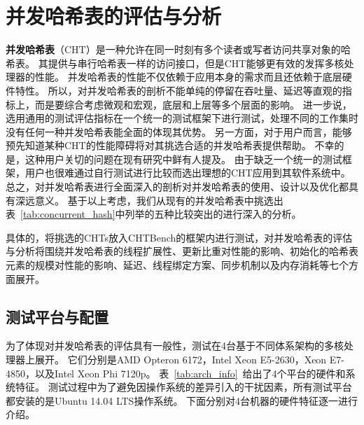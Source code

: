 \section{并发哈希表的评估与分析}
\textbf{并发哈希表}（CHT）是一种允许在同一时刻有多个读者或写者访问共享对象的哈希表。
其提供与串行哈希表一样的访问接口，但是CHT能够更有效的发挥多核处理器的性能。
并发哈希表的性能不仅依赖于应用本身的需求而且还依赖于底层硬件特性。
所以，对并发哈希表的剖析不能单纯的停留在吞吐量、延迟等直观的指标上，而是要综合考虑微观和宏观，底层和上层等多个层面的影响。
进一步说，选用通用的测试评估指标在一个统一的测试框架下进行测试，处理不同的工作集时没有任何一种并发哈希表能全面的体现其优势。
另一方面，对于用户而言，能够预先知道某种CHT的性能障碍将对其挑选合适的并发哈希表提供帮助。
不幸的是，这种用户关切的问题在现有研究中鲜有人提及。
由于缺乏一个统一的测试框架，用户也很难通过自行测试进行比较而选出理想的CHT应用到其软件系统中。
总之，对并发哈希表进行全面深入的剖析对并发哈希表的使用、设计以及优化都具有深远意义。
基于以上考虑，我们从现有的并发哈希表中挑选出表~\ref{tab:concurrent_hash}中列举的五种比较突出的进行深入的分析。

具体的，将挑选的CHTs放入CHTBench的框架内进行测试，对并发哈希表的评估与分析将围绕并发哈希表的线程扩展性、更新比重对性能的影响、初始化的哈希表元素的规模对性能的影响、延迟、线程绑定方案、同步机制以及内存消耗等七个方面展开。

\subsection{测试平台与配置}
为了体现对并发哈希表的评估具有一般性，测试在4台基于不同体系架构的多核处理器上展开。
它们分别是AMD Opteron 6172，Intel Xeon E5-2630，Xeon E7-4850，以及Intel Xeon Phi 7120p。
表~\ref{tab:arch_info}~给出了4个平台的硬件和系统特征。
测试过程中为了避免因操作系统的差异引入的干扰因素，所有测试平台都安装的是Ubuntu 14.04 LTS操作系统。
下面分别对4台机器的硬件特征逐一进行介绍。

